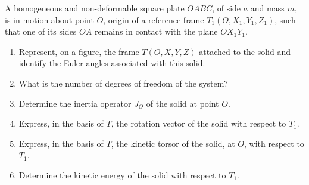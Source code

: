 \documentclass[12pt]{article}
\begin{document}
A homogeneous and non-deformable square plate $OABC$, of side $a$ and mass $m$, is in motion about point $O$, origin of a reference frame $T_1(O, X_1, Y_1, Z_1)$, such that one of its sides $OA$ remains in contact with the plane $OX_1Y_1$.

\begin{enumerate}
    \item Represent, on a figure, the frame $T(O, X, Y, Z)$ attached to the solid and identify the Euler angles associated with this solid.
    \item What is the number of degrees of freedom of the system?
    \item Determine the inertia operator $J_O$ of the solid at point $O$.
    \item Express, in the basis of $T$, the rotation vector of the solid with respect to $T_1$.
    \item Express, in the basis of $T$, the kinetic torsor of the solid, at $O$, with respect to $T_1$.
    \item Determine the kinetic energy of the solid with respect to $T_1$.
\end{enumerate}
\end{document}
